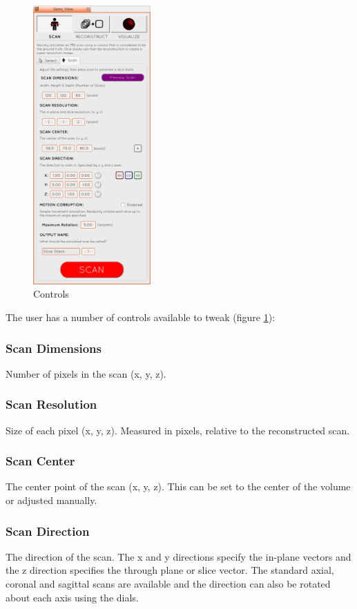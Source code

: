 \begin{figure}
  \vspace{-20pt}
  \includegraphics[width=0.4\textwidth]{images/scan_simulation/scan_settings.png}
  \caption{Controls}\label{fig:scansettings}
\end{figure}

The user has a number of controls available to tweak (figure \ref{fig:scansettings}):

\subsubsection*{Scan Dimensions}
Number of pixels in the scan (x, y, z).

\subsubsection*{Scan Resolution}
Size of each pixel (x, y, z). Measured in pixels, relative to the reconstructed scan.

\subsubsection*{Scan Center}
The center point of the scan (x, y, z). This can be set to the center of the volume or adjusted manually.

\subsubsection*{Scan Direction}
The direction of the scan. The x and y directions specify the in-plane vectors and the z direction specifies the through plane or slice vector. The standard axial, coronal and sagittal scans are available and the direction can also be rotated about each axis using the dials.

